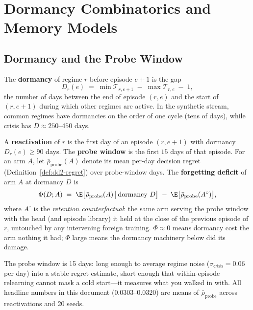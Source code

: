 \section{Dormancy Combinatorics and Memory Models}
\label{sec:dd2-dormancy}

\subsection{Dormancy and the Probe Window}

\begin{definition}[Dormancy]
\label{def:dd2-dormancy}
The \textbf{dormancy} of regime $r$ before episode $e+1$ is the gap
\[
D_r(e) \;=\; \min \mathcal{T}_{r,e+1} \;-\; \max \mathcal{T}_{r,e} \;-\; 1,
\]
the number of days between the end of episode $(r,e)$ and the start of
$(r,e+1)$ during which other regimes are active. In the synthetic stream,
common regimes have dormancies on the order of one cycle (tens of days),
while \textsf{crisis} has $D \approx 250$--$450$ days.
\end{definition}

\begin{definition}
\label{def:dd2-probe}
A \textbf{reactivation} of $r$ is the first day of an episode $(r, e+1)$ with
dormancy $D_r(e) \ge 90$ days. The \textbf{probe window} is the first
$15$ days of that episode. For an arm $A$, let
$\bar\rho_{\mathrm{probe}}(A)$ denote its mean per-day decision regret
(Definition~\ref{def:dd2-regret}) over probe-window days. The
\textbf{forgetting deficit} of arm $A$ at dormancy $D$ is
\begin{equation}
\label{eq:dd2-phi}
\Phi(D; A) \;=\;
\E\bigl[\bar\rho_{\mathrm{probe}}(A) \,\big|\, \text{dormancy } D\bigr]
\;-\;
\E\bigl[\bar\rho_{\mathrm{probe}}(A^{\circ})\bigr],
\end{equation}
where $A^{\circ}$ is the \emph{retention counterfactual}: the same arm
serving the probe window with the head (and episode library) it held at the
close of the previous episode of $r$, untouched by any intervening foreign
training. $\Phi \approx 0$ means dormancy cost the arm nothing it had;
$\Phi$ large means the dormancy machinery below did its damage.
\end{definition}

The probe window is 15 days: long enough to average regime noise
($\sigma_{\textsf{crisis}} = 0.06$ per day) into a stable regret estimate,
short enough that within-episode relearning cannot mask a cold start---it
measures what you walked in with. All headline numbers in this document
($0.0303$--$0.0320$) are means of $\bar\rho_{\mathrm{probe}}$ across
reactivations and 20 seeds.


